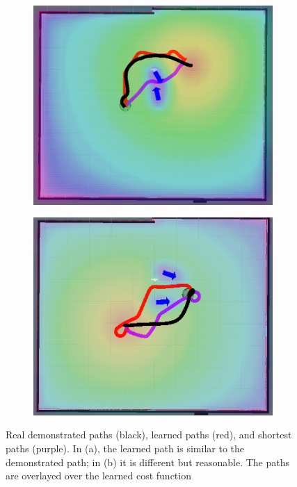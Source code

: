 \documentclass[letterpaper, 10 pt, conference]{ieeeconf}
\begin{document}
			\begin{figure}[tbh]
	\centering
      \begin{subfigure}[b]{0.42\columnwidth}
    \includegraphics[scale=0.15]{images/real_good_new.png}
    \caption{}
    \label{fig:res_real1}
  \end{subfigure}
  \hspace{10mm}
  \begin{subfigure}[b]{0.42\columnwidth}
  \hspace{4mm}
    \includegraphics[scale=0.15]{images/real_reasonable_new.png}
    \caption{}
    \label{fig:res_real4}
  \end{subfigure} 
    \caption{Real demonstrated paths (black), learned paths (red), and shortest paths (purple). In (a), the learned path is similar to the demonstrated path; in (b) it is different but reasonable. The paths are overlayed over the learned cost function}
    \vspace{-2mm}
  \label{fig:results_real}
  \end{figure}
\end{document}
